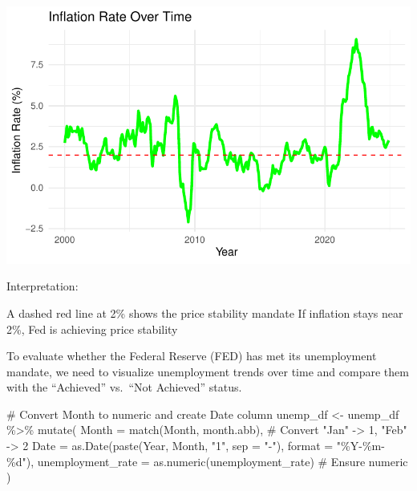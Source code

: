 \documentclass[
  letterpaper,
  DIV=11,
  numbers=noendperiod]{scrartcl}
\newenvironment{Shaded}{\begin{snugshade}}{\end{snugshade}}
\newcommand{\AttributeTok}[1]{\textcolor[rgb]{0.40,0.45,0.13}{#1}}
\newcommand{\CommentTok}[1]{\textcolor[rgb]{0.37,0.37,0.37}{#1}}
\newcommand{\FunctionTok}[1]{\textcolor[rgb]{0.28,0.35,0.67}{#1}}
\newcommand{\NormalTok}[1]{\textcolor[rgb]{0.00,0.23,0.31}{#1}}
\newcommand{\OtherTok}[1]{\textcolor[rgb]{0.00,0.23,0.31}{#1}}
\newcommand{\SpecialCharTok}[1]{\textcolor[rgb]{0.37,0.37,0.37}{#1}}
\newcommand{\StringTok}[1]{\textcolor[rgb]{0.13,0.47,0.30}{#1}}
\begin{document}
\includegraphics{Assignment2_Data608_Quarto_files/figure-pdf/unnamed-chunk-27-1.pdf}

Interpretation:

A dashed red line at 2\% shows the price stability mandate If inflation
stays near 2\%, Fed is achieving price stability

To evaluate whether the Federal Reserve (FED) has met its unemployment
mandate, we need to visualize unemployment trends over time and compare
them with the ``Achieved'' vs.~``Not Achieved'' status.

\begin{Shaded}
\begin{Highlighting}[]
\CommentTok{\# Convert Month to numeric and create Date column}
\NormalTok{unemp\_df }\OtherTok{\textless{}{-}}\NormalTok{ unemp\_df }\SpecialCharTok{\%\textgreater{}\%}
  \FunctionTok{mutate}\NormalTok{(}
    \AttributeTok{Month =} \FunctionTok{match}\NormalTok{(Month, month.abb),  }\CommentTok{\# Convert "Jan" {-}\textgreater{} 1, "Feb" {-}\textgreater{} 2}
    \AttributeTok{Date =} \FunctionTok{as.Date}\NormalTok{(}\FunctionTok{paste}\NormalTok{(Year, Month, }\StringTok{"1"}\NormalTok{, }\AttributeTok{sep =} \StringTok{"{-}"}\NormalTok{), }\AttributeTok{format =} \StringTok{"\%Y{-}\%m{-}\%d"}\NormalTok{),}
    \AttributeTok{unemployment\_rate =} \FunctionTok{as.numeric}\NormalTok{(unemployment\_rate)  }\CommentTok{\# Ensure numeric}
\NormalTok{  )}
\end{Highlighting}
\end{Shaded}
\end{document}
